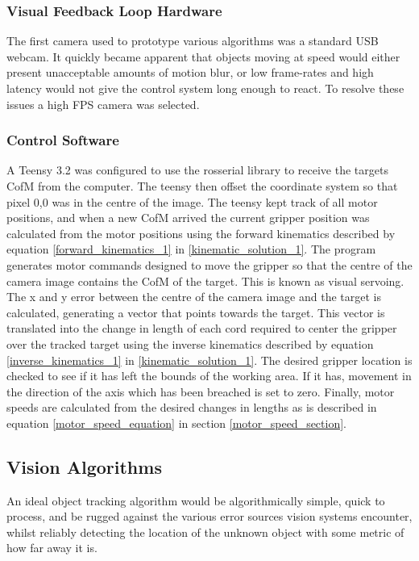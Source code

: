 \documentclass[conference]{IEEEtran}
\begin{document}
\subsubsection{Visual Feedback Loop Hardware}
The first camera used to prototype various algorithms was a standard USB webcam. It quickly became apparent that objects moving at speed would either present unacceptable amounts of motion blur, or low frame-rates and high latency would not give the control system long enough to react. To resolve these issues  a high FPS camera was selected. 

\subsubsection{Control Software}
A Teensy 3.2 was configured to use the rosserial library to receive the targets CofM from the computer. The teensy then offset the coordinate system so that pixel 0,0 was in the centre of the image. The teensy kept track of all motor positions, and when a new CofM arrived the current gripper position was calculated from the motor positions using the forward kinematics described by equation \ref{forward_kinematics_1} in \ref{kinematic_solution_1}. The program generates motor commands designed to move the gripper so that the centre of the camera image contains the CofM of the target. This is known as visual servoing. The x and y error between the centre of the camera image and the target is calculated, generating a vector that points towards the target. This vector is translated into the change in length of each cord required to center the gripper over the tracked target using the inverse kinematics described by equation \ref{inverse_kinematics_1} in \ref{kinematic_solution_1}. The desired gripper location is checked to see if it has left the bounds of the working area. If it has, movement in the direction of the axis which has been breached is set to zero. Finally, motor speeds are calculated from the desired changes in lengths as is described in equation \ref{motor_speed_equation} in section \ref{motor_speed_section}.

\subsection{Vision Algorithms}
An ideal object tracking algorithm would be algorithmically simple, quick to process, and be rugged against the various error sources vision systems encounter, whilst reliably detecting the location of the unknown object with some metric of how far away it is.
\end{document}
